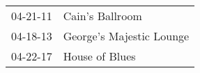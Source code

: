 \begin{supertabular}{p{0.25\columnwidth}p{0.75\columnwidth}}
 04-21-11 &           Cain's Ballroom \\
 04-18-13 &  George's Majestic Lounge \\
 04-22-17 &            House of Blues \\
\end{supertabular}
